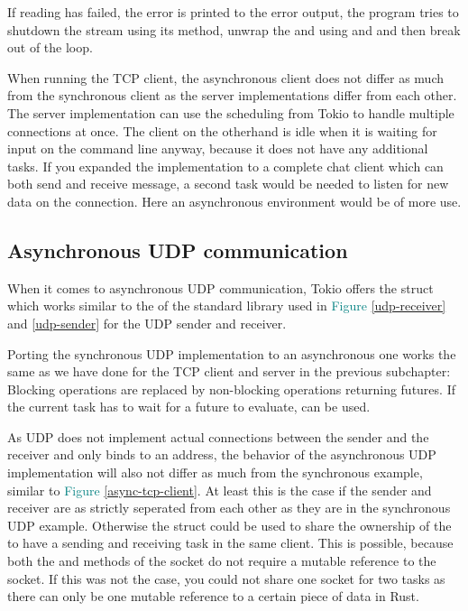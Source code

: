 If reading has failed, the error is printed to the error output, the program tries to shutdown the stream using its
 method, unwrap the  and  using  and  and then break out
of the loop.

When running the TCP client, the asynchronous client does not differ as much from the synchronous client as the server
implementations differ from each other. The server implementation can use the scheduling from Tokio to handle multiple
connections at once. The client on the otherhand is idle when it is waiting for input on the command line anyway,
because it does not have any additional tasks. If you expanded the implementation to a complete chat client which can
both send and receive message, a second task would be needed to listen for new data on the connection. Here an
asynchronous environment would be of more use.

\subsection{Asynchronous UDP communication}
When it comes to asynchronous UDP communication, Tokio offers the struct  which works
similar to the  of the standard library used in \textcolor{teal}{Figure \ref{udp-receiver}} and
\textcolor{teal}{\ref{udp-sender}} for the UDP sender and receiver.

Porting the synchronous UDP implementation to an asynchronous one works the same as we have done for the TCP client and
server in the previous subchapter: Blocking operations are replaced by non-blocking operations returning futures. If
the current task has to wait for a future to evaluate,  can be used.

As UDP does not implement actual connections between the sender and the receiver and only binds to an address, the
behavior of the asynchronous UDP implementation will also not differ as much from the synchronous example, similar to
\textcolor{teal}{Figure \ref{async-tcp-client}}. At least this is the case if the sender and receiver are as strictly
seperated from each other as they are in the synchronous UDP example. Otherwise the struct  could
be used to share the ownership of the  to have a sending and receiving task in the same client. This is
possible, because both the  and  methods of the socket do not require a mutable reference
to the socket. If this was not the case, you could not share one socket for two tasks as there can only be one mutable
reference to a certain piece of data in Rust.
